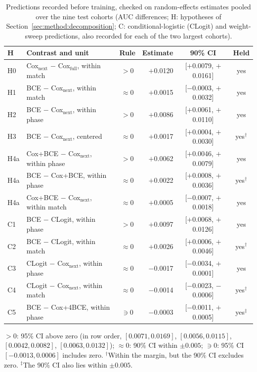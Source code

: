 \begin{table}[b]
\centering\footnotesize
\caption{Predictions recorded before training, checked on random-effects estimates pooled over the nine test cohorts (AUC differences; H: hypotheses of Section~\ref{sec:method:decomposition}; C: conditional-logistic (CLogit) and weight-sweep predictions, also recorded for each of the two largest cohorts).}
\label{tab:predictions}
\setlength{\tabcolsep}{2.1pt}
\begin{tabular}{llcrcc}
\toprule
H & Contrast and unit & Rule & Estimate & 90\% CI & Held \\
\midrule
H0 & Cox$_{\mathrm{next}}$ $-$ Cox$_{\mathrm{full}}$, within match & $>0$ & $+$0.0120 & [$+$0.0079, $+$0.0161] & yes \\
H1 & BCE $-$ Cox$_{\mathrm{next}}$, within match & $\approx0$ & $+$0.0015 & [$-$0.0003, $+$0.0032] & yes \\
H2 & BCE $-$ Cox$_{\mathrm{next}}$, within phase & $>0$ & $+$0.0086 & [$+$0.0061, $+$0.0110] & yes \\
H3 & BCE $-$ Cox$_{\mathrm{next}}$, centered & $\approx0$ & $+$0.0017 & [$+$0.0004, $+$0.0030] & yes$^\dagger$ \\
H4a & Cox+BCE $-$ Cox$_{\mathrm{next}}$, within phase & $>0$ & $+$0.0062 & [$+$0.0046, $+$0.0079] & yes \\
H4a & BCE $-$ Cox+BCE, within phase & $\approx0$ & $+$0.0022 & [$+$0.0008, $+$0.0036] & yes$^\dagger$ \\
H4a & Cox+BCE $-$ Cox$_{\mathrm{next}}$, within match & $\approx0$ & $+$0.0005 & [$-$0.0007, $+$0.0018] & yes \\
\midrule
C1 & BCE $-$ CLogit, within phase & $>0$ & $+$0.0097 & [$+$0.0068, $+$0.0126] & yes \\
C2 & BCE $-$ CLogit, within match & $\approx0$ & $+$0.0026 & [$+$0.0006, $+$0.0046] & yes$^\dagger$ \\
C3 & CLogit $-$ Cox$_{\mathrm{next}}$, within phase & $\approx0$ & $-$0.0017 & [$-$0.0034, $+$0.0001] & yes \\
C4 & CLogit $-$ Cox$_{\mathrm{next}}$, within match & $\approx0$ & $-$0.0014 & [$-$0.0023, $-$0.0006] & yes$^\dagger$ \\
C5 & BCE $-$ Cox+4BCE, within phase & $\ni0$ & $-$0.0003 & [$-$0.0011, $+$0.0005] & yes$^\ddagger$ \\
\bottomrule
\end{tabular}
\smallskip
\parbox{\columnwidth}{\scriptsize $>0$: 95\% CI above zero (in row order, $[0.0071, 0.0169]$, $[0.0056, 0.0115]$, $[0.0042, 0.0082]$, $[0.0063, 0.0132]$); $\approx0$: 90\% CI within $\pm0.005$; $\ni0$: 95\% CI $[-0.0013, 0.0006]$ includes zero. $^\dagger$Within the margin, but the 90\% CI excludes zero. $^\ddagger$The 90\% CI also lies within $\pm0.005$.}
\end{table}
